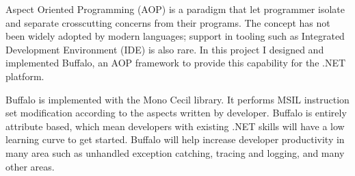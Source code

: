 \begin{abstractpage}
Aspect Oriented Programming (AOP) is a paradigm that let programmer isolate and separate crosscutting concerns from their programs. The concept has not been widely adopted by modern languages; support in tooling such as Integrated Development Environment (IDE) is also rare. In this project I designed and implemented Buffalo, an AOP framework to provide this capability for the .NET platform.

Buffalo is implemented with the Mono Cecil library. It performs MSIL instruction set modification according to the aspects written by developer. Buffalo is entirely attribute based, which mean developers with existing .NET skills will have a low learning curve to get started. Buffalo will help increase developer productivity in many area such as unhandled exception catching, tracing and logging, and many other areas.
\end{abstractpage}
